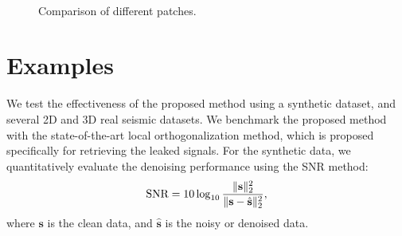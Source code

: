 {\begin{figure}[htb!]
\centering
   \\
\caption{Comparison of different patches.  }
\label{fig:hyper_XXn_z,hyper_Xn_z}
\end{figure}
}
\section{Examples}
We test the effectiveness of the proposed method using a synthetic dataset, and several 2D and 3D real seismic datasets. We benchmark the proposed method with the state-of-the-art local orthogonalization method, which is proposed specifically for retrieving the leaked signals. For the synthetic data, we quantitatively evaluate the denoising performance using the SNR method:
\begin{equation}
\label{eq:snr}
\text{SNR}=10\log_{10}\frac{\Arrowvert \mathbf{s} \Arrowvert_2^2}{\Arrowvert \mathbf{s} -\hat{\mathbf{s}}\Arrowvert_2^2},
\end{equation}
where $\mathbf{s}$ is the clean data, and $\hat{\mathbf{s}}$ is the noisy or denoised data. 

